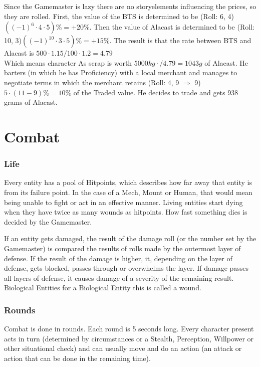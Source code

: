 Since the Gamemaster is lazy there are no storyelements influencing the prices, so they are rolled.
First, the value of
the BTS is determined to be (Roll: 6, 4) \(((-1)^{6}\cdot4\cdot5) \% = +20\%\).
Then the value of Alacast is determined
to be (Roll: 10, 3)\(((-1)^{10}\cdot3\cdot5) \% = +15\%\).
The result is that the rate between BTS and Alacast is
\( 500\cdot1.15/100\cdot1.2 = 4.79\) \\ Which means character As scrap is worth
\(5000 kg\cdot / 4.79 = 1043 g \) of Alacast.
He barters (in which he has Proficiency) with a local merchant and manages to
negotiate terms in which the merchant retains (Roll: 4, 9 \(\Rightarrow\) 9) \(5\cdot(11-9)\% = 10\%\) of the Traded
value.
He decides to trade and gets 938 grams of Alacast.\vspace{1.5cm}
\pagebreak

\chapter{Combat}\label{ch:combat}
\subsection{Life}\label{subsec:life}
Every entity has a pool of Hitpoints, which describes how far away that entity is from its failure point.
In the case of a Mech, Mount or Human, that would mean being unable to fight or act in an effective manner.
Living
entities start dying when they have twice as many wounds as hitpoints.
How fast something dies is decided by the
Gamemaster.\par
If an entity gets damaged, the result of the damage roll (or the number set by the Gamemaster) is compared the results
of rolls made by the outermost layer of defense.
If the result of the damage is higher, it, depending on the
layer of defense, gets blocked, passes through or overwhelms the layer.
If damage passes all layers of defense,
it causes damage of a severity of the remaining result.
Biological Entities for a Biological Entity this is called a wound.
\subsection{Rounds}
Combat is done in rounds.
Each round is 5 seconds long.
Every character present acts in turn (determined
by circumstances or a Stealth, Perception, Willpower or other situational check) and can usually move and do an action
(an attack or action that can be done in the remaining time).

